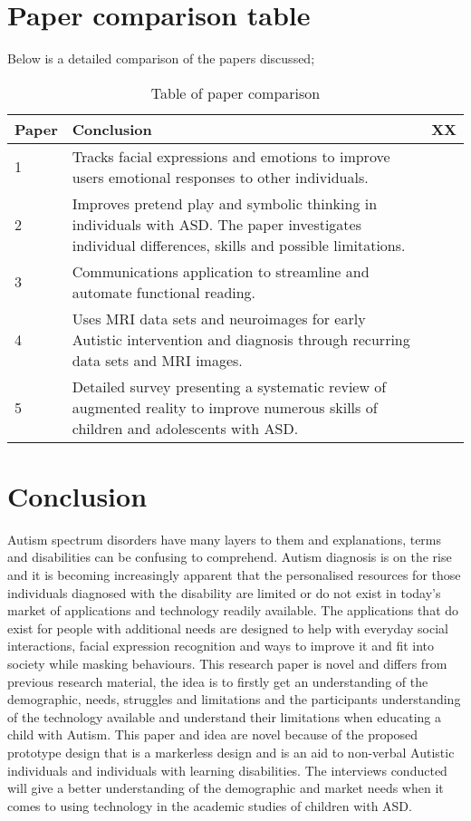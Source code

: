\newpage
\section{Paper comparison table} 
Below is a detailed comparison of the papers discussed;
\begin{table} [h]
    \centering
\begin{tabular}{  m{2em} | m{7cm}| m{2cm} } 
\hline
Paper & Conclusion & XX   \\ 
\hline
1 & Tracks facial expressions and emotions to improve users emotional responses to other individuals.  \\ 
\hline
2 & Improves pretend play and symbolic thinking in individuals with ASD. The paper investigates individual differences, skills and possible limitations. \\ 
\hline
3 & Communications application to streamline and automate functional reading. \\ 
\hline
4 & Uses MRI data sets and neuroimages for early Autistic intervention and diagnosis through recurring data sets and MRI images. \\ 
\hline
5 & Detailed survey presenting a systematic review of augmented reality to improve numerous skills of children and adolescents with ASD. \\ 
\hline
\end{tabular}
\centering
\caption{Table of paper comparison}
    \label{tab:my_label}
\end{table}

\section{Conclusion}

Autism spectrum disorders have many layers to them and explanations, terms and disabilities  can be confusing to comprehend. Autism diagnosis is on the rise and it is becoming increasingly apparent that the personalised resources for those individuals diagnosed with the disability are limited or do not exist in today's market of applications and technology readily available. The applications that do exist for people with additional needs are designed to help with everyday social interactions, facial expression recognition and ways to improve it and fit into society while masking behaviours. This research paper is novel and differs from previous research material, the idea is to firstly get an understanding of the demographic, needs, struggles and limitations and the participants understanding of the technology available and understand their limitations when educating a child with Autism. This paper and idea are novel because of the proposed prototype design that is a markerless design and is an aid to non-verbal Autistic individuals and individuals with learning disabilities. The interviews conducted will give a better understanding of the demographic and market needs when it comes to using technology in the academic studies of children with ASD.



